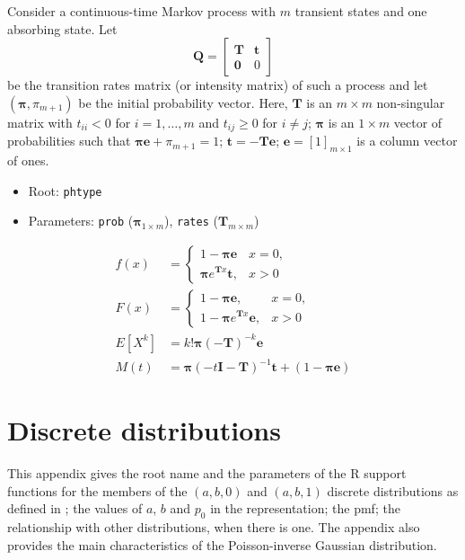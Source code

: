 \documentclass[x11names]{article}
\newcommand{\E}[1]{E[ #1 ]}
\newcommand{\mat}[1]{\mathbold{#1}} %
\newcommand{\proglang}[1]{\textsf{#1}}
\newcommand{\code}[1]{\texttt{#1}}
\begin{document}
Consider a continuous-time Markov process with $m$ transient
states and one absorbing state. Let
\begin{equation}
  \label{eq:Markov-transition-matrix}
  \mat{Q} =
  \begin{bmatrix}
    \mat{T} & \mat{t} \\
    \mat{0} & 0
  \end{bmatrix}
\end{equation}
be the transition rates matrix (or intensity matrix) of such a process
and let $(\mat{\pi}, \pi_{m + 1})$ be the initial probability vector.
Here, $\mat{T}$ is an $m \times m$ non-singular matrix with
$t_{ii} < 0$ for $i = 1, \dots, m$ and $t_{ij} \geq 0$ for $i \neq j$;
$\mat{\pi}$ is an $1 \times m$ vector of probabilities such that
$\mat{\pi} \mat{e} + \pi_{m + 1} = 1$; $\mat{t} = -\mat{T} \mat{e}$;
$\mat{e} = [1]_{m \times 1}$ is a column vector of ones. %
\bigskip

\begin{itemize}
\item Root: \code{phtype}
\item Parameters: \code{prob} ($\mat{\pi}_{1 \times m}$),
    \code{rates} ($\mat{T}_{m \times m}$)
\end{itemize}

\begin{align*}
  f(x)
  &=
    \begin{cases}
      1 - \mat{\pi} \mat{e} & x = 0, \\
      \mat{\pi} e^{\mat{T} x} \mat{t}, & x > 0
    \end{cases} \\
  F(x)
  &=
    \begin{cases}
      1 - \mat{\pi} \mat{e}, & x = 0, \\
      1 - \mat{\pi} e^{\mat{T} x} \mat{e}, & x > 0
    \end{cases} \\
  \E{X^k}
  &= k! \mat{\pi} (-\mat{T})^{-k} \mat{e} \\
  M(t)
  &= \mat{\pi} (-t \mat{I} - \mat{T})^{-1} \mat{t}
    + (1 - \mat{\pi} \mat{e})
\end{align*}


\section{Discrete distributions}
\label{sec:app:discrete}

This appendix gives the root name and the parameters of the
\proglang{R} support functions for the members of the $(a, b, 0)$ and
$(a, b, 1)$ discrete distributions as defined in \cite{LossModels4e};
the values of $a$, $b$ and $p_0$ in the representation; the pmf; the
relationship with other distributions, when there is one. The appendix
also provides the main characteristics of the Poisson-inverse Gaussian
distribution.
\end{document}
